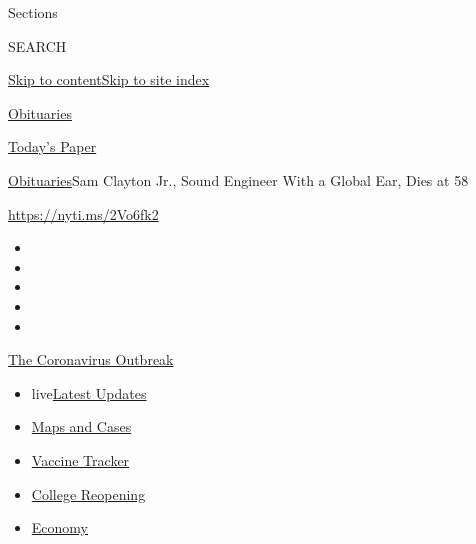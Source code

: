 Sections

SEARCH

\protect\hyperlink{site-content}{Skip to
content}\protect\hyperlink{site-index}{Skip to site index}

\href{https://www.nytimes3xbfgragh.onion/section/obituaries}{Obituaries}

\href{https://myaccount.nytimes3xbfgragh.onion/auth/login?response_type=cookie\&client_id=vi}{}

\href{https://www.nytimes3xbfgragh.onion/section/todayspaper}{Today's
Paper}

\href{/section/obituaries}{Obituaries}\textbar{}Sam Clayton Jr., Sound
Engineer With a Global Ear, Dies at 58

\url{https://nyti.ms/2Vo6fk2}

\begin{itemize}
\item
\item
\item
\item
\item
\end{itemize}

\href{https://www.nytimes3xbfgragh.onion/news-event/coronavirus?action=click\&pgtype=Article\&state=default\&region=TOP_BANNER\&context=storylines_menu}{The
Coronavirus Outbreak}

\begin{itemize}
\tightlist
\item
  live\href{https://www.nytimes3xbfgragh.onion/2020/08/04/world/coronavirus-covid-19.html?action=click\&pgtype=Article\&state=default\&region=TOP_BANNER\&context=storylines_menu}{Latest
  Updates}
\item
  \href{https://www.nytimes3xbfgragh.onion/interactive/2020/us/coronavirus-us-cases.html?action=click\&pgtype=Article\&state=default\&region=TOP_BANNER\&context=storylines_menu}{Maps
  and Cases}
\item
  \href{https://www.nytimes3xbfgragh.onion/interactive/2020/science/coronavirus-vaccine-tracker.html?action=click\&pgtype=Article\&state=default\&region=TOP_BANNER\&context=storylines_menu}{Vaccine
  Tracker}
\item
  \href{https://www.nytimes3xbfgragh.onion/2020/08/02/us/covid-college-reopening.html?action=click\&pgtype=Article\&state=default\&region=TOP_BANNER\&context=storylines_menu}{College
  Reopening}
\item
  \href{https://www.nytimes3xbfgragh.onion/live/2020/08/03/business/stock-market-today-coronavirus?action=click\&pgtype=Article\&state=default\&region=TOP_BANNER\&context=storylines_menu}{Economy}
\end{itemize}

